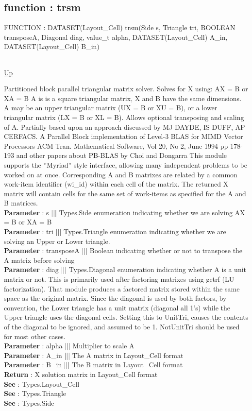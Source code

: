 \subsection*{function : trsm}
\hypertarget{ecldoc:pbblas.trsm}{FUNCTION : DATASET(Layout\_Cell) trsm(Side s, Triangle tri, BOOLEAN transposeA, Diagonal diag, value\_t alpha, DATASET(Layout\_Cell) A\_in, DATASET(Layout\_Cell) B\_in)} \\
\hyperlink{ecldoc:}{Up} \\
\par
Partitioned block parallel triangular matrix solver. Solves for X using: AX = B or XA = B A is is a square triangular matrix, X and B have the same dimensions. A may be an upper triangular matrix (UX = B or XU = B), or a lower triangular matrix (LX = B or XL = B). Allows optional transposing and scaling of A. Partially based upon an approach discussed by MJ DAYDE, IS DUFF, AP CERFACS. A Parallel Block implementation of Level-3 BLAS for MIMD Vector Processors ACM Tran. Mathematical Software, Vol 20, No 2, June 1994 pp 178-193 and other papers about PB-BLAS by Choi and Dongarra This module supports the ''Myriad'' style interface, allowing many independent problems to be worked on at once. Corresponding A and B matrixes are related by a common work-item identifier (wi\_id) within each cell of the matrix. The returned X matrix will contain cells for the same set of work-items as specified for the A and B matrices. \\
\textbf{Parameter} : s ||| Types.Side enumeration indicating whether we are solving AX = B or XA = B \\
\textbf{Parameter} : tri ||| Types.Triangle enumeration indicating whether we are solving an Upper or Lower triangle. \\
\textbf{Parameter} : transposeA ||| Boolean indicating whether or not to transpose the A matrix before solving \\
\textbf{Parameter} : diag ||| Types.Diagonal enumeration indicating whether A is a unit matrix or not. This is primarily used after factoring matrixes using getrf (LU factorization). That module produces a factored matrix stored within the same space as the original matrix. Since the diagonal is used by both factors, by convention, the Lower triangle has a unit matrix (diagonal all 1's) while the Upper triangle uses the diagonal cells. Setting this to UnitTri, causes the contents of the diagonal to be ignored, and assumed to be 1. NotUnitTri should be used for most other cases. \\
\textbf{Parameter} : alpha ||| Multiplier to scale A \\
\textbf{Parameter} : A\_in ||| The A matrix in Layout\_Cell format \\
\textbf{Parameter} : B\_in ||| The B matrix in Layout\_Cell format \\
\textbf{Return} : X solution matrix in Layout\_Cell format \\
\textbf{See} : Types.Layout\_Cell \\
\textbf{See} : Types.Triangle \\
\textbf{See} : Types.Side \\
